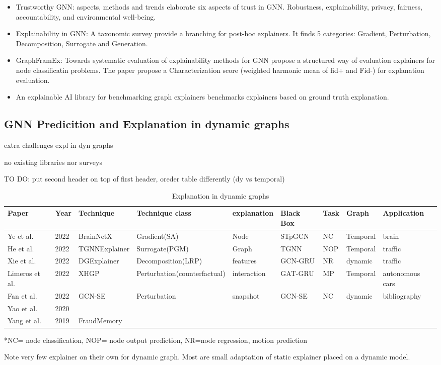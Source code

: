 \begin{itemize}
    \item Trustworthy GNN: aspects, methods and trends \cite{dai_comprehensive_2022} elaborate six aspects of trust in GNN. Robustness, explainability, privacy, fairness, accountability, and environmental well-being.
    \item Explainability in GNN: A taxonomic survey \cite{yuan_explainability_2023} provide a branching for post-hoc explainers. It finds 5 categories: Gradient, Perturbation, Decomposition, Surrogate and Generation.
    \item GraphFramEx: Towards systematic evaluation of explainability methods for GNN \cite{amara_graphframex_2022} propose a structured way of evaluation explainers for node classificatin problems. The paper propose a Characterization score (weighted harmonic mean of fid+ and Fid-) for explanation evaluation.
    \item An explainable AI library for benchmarking graph explainers \cite{agarwal_explainable_2022} benchmarks explainers based on ground truth explanation.
\end{itemize} 


\subsection{GNN Predicition and Explanation in dynamic graphs}
extra challenges expl in dyn graphs

no existing libraries nor surveys

TO DO: put second header on top of first header, oreder table differently (dy vs temporal)

\begin{table}
\caption{Explanation in dynamic graphs}\label{tab1}
\begin{tabular}{|l|l|l|l|l|l|l|l|l|}
\hline
Paper &  Year & Technique & Technique class & explanation & Black Box & Task & Graph & Application \\
\hline
 Ye et al.\cite{BrainNetX}& 2022 & BrainNetX & Gradient(SA) & Node & STpGCN & NC & Temporal & brain \\
 He et al.\cite{PGM}& 2022& TGNNExplainer & Surrogate(PGM) & Graph & TGNN &  NOP & Temporal & traffic\\
 Xie et al.\cite{DGExpl}& 2022 & DGExplainer & Decomposition(LRP) & features & GCN-GRU & NR & dynamic & traffic\\
 Limeros et al.\cite{XHGP}& 2022 & XHGP & Perturbation(counterfactual) & interaction & GAT-GRU & MP &Temporal & autonomous cars\\
 Fan et al.\cite{gcn-se}& 2022 & GCN-SE & Perturbation & snapshot & GCN-SE & NC & dynamic & bibliography\\
 Yao et al.\cite{}& 2020 &  \\
 Yang et al.\cite{FraudMemo}& 2019 & FraudMemory & \\
\hline
\end{tabular}
\end{table}
*NC= node classification, NOP= node output prediction, NR=node regression, motion prediction

Note very few explainer on their own for dynamic graph. Most are small adaptation of static explainer placed on a dynamic model.